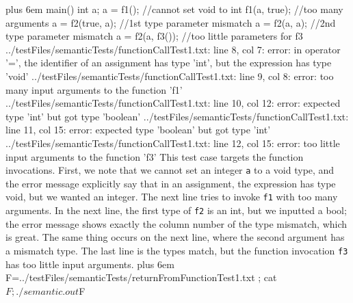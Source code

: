 \documentclass{article}
\makeatletter
\newenvironment{myverb}
 {\def\@xobeysp{\ }\verbatim\rightskip=0pt plus 6em\relax}
 {\endverbatim}
\makeatother
\begin{document}
\begin{itemize}
\begin{myverb}
main(){
    int a;
    a = f1(); //cannot set void to int
    f1(a, true); //too many arguments
    a = f2(true, a); //1st type parameter mismatch
    a = f2(a, a); //2nd type parameter mismatch
    a = f2(a, f3()); //too little parameters for f3
}
../testFiles/semanticTests/functionCallTest1.txt: line 8, col 7: error: in operator '=', the identifier of an assignment has type 'int', but the expression has type 'void'
../testFiles/semanticTests/functionCallTest1.txt: line 9, col 8: error: too many input arguments to the function 'f1'
../testFiles/semanticTests/functionCallTest1.txt: line 10, col 12: error: expected type 'int' but got type 'boolean'
../testFiles/semanticTests/functionCallTest1.txt: line 11, col 15: error: expected type 'boolean' but got type 'int'
../testFiles/semanticTests/functionCallTest1.txt: line 12, col 15: error: too little input arguments to the function 'f3'
\end{myverb}
This test case targets the function invocations. First, we note that we cannot set an integer \verb|a| to a void type, and the error message explicitly say that in an assignment, the expression has type void, but we wanted an integer.
The next line tries to invoke \verb|f1| with too many arguments. In the next line, the first type of \verb|f2| is an int, but we inputted a bool; the error message shows exactly the column number of the type mismatch, which is great. The same thing occurs on the next line, where the second argument has a mismatch type. The last line is the types match, but the function invocation \verb|f3| has too little input arguments.
\begin{myverb}
     F=../testFiles/semanticTests/returnFromFunctionTest1.txt ; cat $F; ./semantic.out $F


\end{myverb}
\end{itemize}
\end{document}
